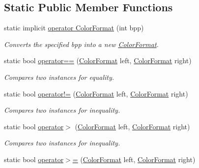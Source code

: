 \subsection*{Static Public Member Functions}
\begin{DoxyCompactItemize}
\item 
static implicit \hyperlink{struct_open_t_k_1_1_graphics_1_1_color_format_a7a0e264a4796131d0d0da929ec4b2691}{operator Color\-Format} (int bpp)
\begin{DoxyCompactList}\small\item\em Converts the specified bpp into a new \hyperlink{struct_open_t_k_1_1_graphics_1_1_color_format}{Color\-Format}. \end{DoxyCompactList}\item 
static bool \hyperlink{struct_open_t_k_1_1_graphics_1_1_color_format_afb84a542903758706e5dfb822f2f43d1}{operator==} (\hyperlink{struct_open_t_k_1_1_graphics_1_1_color_format}{Color\-Format} left, \hyperlink{struct_open_t_k_1_1_graphics_1_1_color_format}{Color\-Format} right)
\begin{DoxyCompactList}\small\item\em Compares two instances for equality. \end{DoxyCompactList}\item 
static bool \hyperlink{struct_open_t_k_1_1_graphics_1_1_color_format_a97942aad0109ade04ff82fd762fe60f3}{operator!=} (\hyperlink{struct_open_t_k_1_1_graphics_1_1_color_format}{Color\-Format} left, \hyperlink{struct_open_t_k_1_1_graphics_1_1_color_format}{Color\-Format} right)
\begin{DoxyCompactList}\small\item\em Compares two instances for inequality. \end{DoxyCompactList}\item 
static bool \hyperlink{struct_open_t_k_1_1_graphics_1_1_color_format_adf4db5ba1534765fb9184d79d0aa0132}{operator$>$} (\hyperlink{struct_open_t_k_1_1_graphics_1_1_color_format}{Color\-Format} left, \hyperlink{struct_open_t_k_1_1_graphics_1_1_color_format}{Color\-Format} right)
\begin{DoxyCompactList}\small\item\em Compares two instances for inequality. \end{DoxyCompactList}\item 
static bool \hyperlink{struct_open_t_k_1_1_graphics_1_1_color_format_a46866fe4f602de415f8650574df42a6f}{operator$>$=} (\hyperlink{struct_open_t_k_1_1_graphics_1_1_color_format}{Color\-Format} left, \hyperlink{struct_open_t_k_1_1_graphics_1_1_color_format}{Color\-Format} right)

\end{DoxyCompactItemize}
